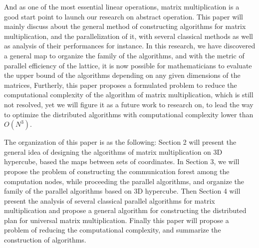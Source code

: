 \documentclass{amsart}
\theoremstyle{definition}
\theoremstyle{remark}
\numberwithin{equation}{section}
\begin{document}
	And as one of the most essential linear operations, matrix multiplication is a good start point to launch our research on abstract operation. This paper will mainly discuss about the general method of constructing algorithms for matrix multiplication, and the parallelization of it, with several classical methods as well as analysis of their performances for instance.
In this research, we have discovered a general map to organize the family of the algorithms, and with the metric of parallel efficiency of the lattice, it is now possible for mathematicians to evaluate the upper bound of the algorithms depending on any given dimensions of the matrices, 
Furtherly, this paper proposes a formulated problem to reduce the computational complexity of the algorithm of matrix multiplication, which is still not resolved, yet we will figure it as a future work to research on, to lead the way to optimize the distributed algorithms with computational complexity lower than $O(N^3)$.\par

	The organization of this paper is as the following: Section 2 will present the general idea of designing the algorithms of matrix multiplication on 3D hypercube, based the maps between sets of coordinates. In Section 3, we will propose the problem of constructing the communication forest among the computation nodes, while proceeding the parallel algorithms, and organize the family of the parallel algorithms based on 3D hypercube. Then Section 4 will present the analysis of several classical parallel algorithms for matrix multiplication and propose a general algorithm for constructing the distributed plan for universal matrix multiplication. Finally this paper will propose a problem of reducing the computational complexity, and summarize the construction of algorithms.\par
~\\
\end{document}
